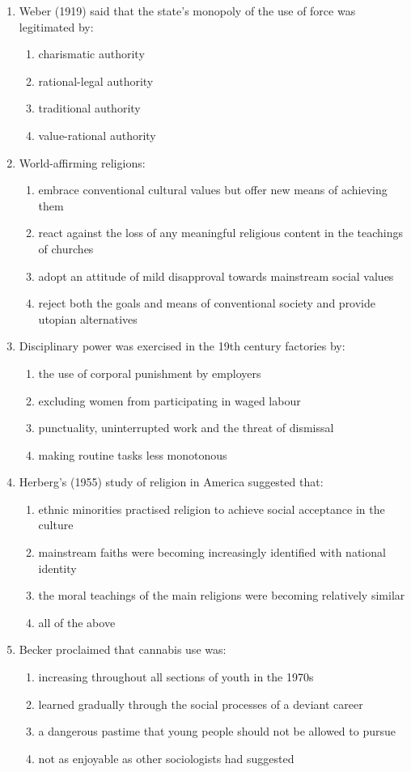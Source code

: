 \documentclass[12pt]{article}
\begin{document}
\begin{enumerate}[label=\arabic*.]
\item Weber (1919) said that the state's monopoly of the use of force was legitimated by:
\begin{enumerate}[label=(\alph*)]
    \item charismatic authority
    \item rational-legal authority
    \item traditional authority
    \item value-rational authority
\end{enumerate}
\item World-affirming religions:
\begin{enumerate}[label=(\alph*)]
    \item embrace conventional cultural values but offer new means of achieving them
    \item react against the loss of any meaningful religious content in the teachings of churches
    \item adopt an attitude of mild disapproval towards mainstream social values
    \item reject both the goals and means of conventional society and provide utopian alternatives
\end{enumerate}
\item Disciplinary power was exercised in the 19th century factories by:
\begin{enumerate}[label=(\alph*)]
    \item the use of corporal punishment by employers
    \item excluding women from participating in waged labour
    \item punctuality, uninterrupted work and the threat of dismissal
    \item making routine tasks less monotonous
\end{enumerate}
\item Herberg's (1955) study of religion in America suggested that:
\begin{enumerate}[label=(\alph*)]
    \item ethnic minorities practised religion to achieve social acceptance in the culture
    \item mainstream faiths were becoming increasingly identified with national identity
    \item the moral teachings of the main religions were becoming relatively similar
    \item all of the above
\end{enumerate}
\item Becker proclaimed that cannabis use was:
\begin{enumerate}[label=(\alph*)]
    \item increasing throughout all sections of youth in the 1970s
    \item learned gradually through the social processes of a deviant career
    \item a dangerous pastime that young people should not be allowed to pursue
    \item not as enjoyable as other sociologists had suggested
\end{enumerate}
\end{enumerate}
\end{document}
